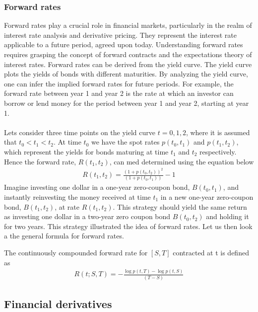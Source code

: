 \subsubsection{Forward rates}
Forward rates play a crucial role in financial markets, particularly in the realm of interest rate analysis and 
derivative pricing. They represent the interest rate applicable to a future period, agreed upon today.
Understanding forward rates requires grasping the concept of forward contracts and the expectations theory of interest rates.
Forward rates can be derived from the yield curve. The yield curve plots the yields of bonds with different maturities.
By analyzing the yield curve, one can infer the implied forward rates for future periods. For example, 
the forward rate between year 1 and year 2 is the rate at which an investor can borrow or lend money for the period
between year 1 and year 2, starting at year 1.
\\\\
Lets consider three time points on the yield curve $t=0,1,2$, where it is assumed
that $t_0 < t_1 < t_2$. At time $t_0$ we have the spot rates $p(t_0,t_1)$ and $p(t_1,t_2)$,
which represent the yields for bonds maturing at time $t_1$ and $t_2$ respectively.
Hence the forward rate, $R(t_1,t_2)$, can med determined using the equation below \cite{Bjork}
\begin{align*}
    R(t_1,t_2)= \frac{(1+p(t_0,t_2))^2}{(1+p(t_0,t_1))}-1
\end{align*}
Imagine investing one dollar in a one-year zero-coupon bond, $B(t_0,t_1)$,
and instantly reinvesting the money received at time $t_1$ in a new one-year zero-coupon bond,
$B(t_1,t_2)$, at rate $R(t_1,t_2)$. This strategy should yield the same return as investing 
one dollar in a two-year zero coupon bond $B(t_0,t_2)$ and holding it for two years. 
This strategy illustrated the idea of forward rates. Let us then look a the general
formula for forward rates. 
\begin{definition}\label{def:forward}
    The continuously compounded forward rate for $[S,T]$ contracted at t is defined
    as \cite{Bjork} 
    \begin{align*}
        R(t;S,T)= - \frac{\log p(t,T)- \log p(t,S)}{(T-S)} 
    \end{align*}
\end{definition} 
\subsection{Financial derivatives}
